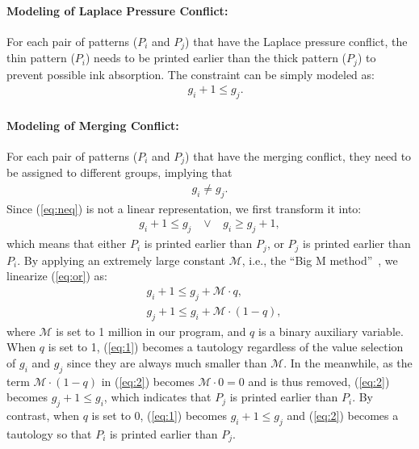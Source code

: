 \paragraph{Modeling of Laplace Pressure Conflict: }

For each pair of patterns ($P_i$ and $P_j$) that have the Laplace pressure conflict,
the thin pattern ($P_i$) needs to be printed earlier than the thick pattern ($P_j$) to prevent possible ink absorption.
The constraint can be simply modeled as:
\begin{align}
\quad g_i + 1 \leq g_j. \label{eq:merge}
\end{align}

\paragraph{Modeling of Merging Conflict: }

For each pair of patterns ($P_i$ and $P_j$) that have the merging conflict,
they need to be assigned to different groups,
implying that
\begin{align}
g_i \neq g_j. \label{eq:neq}
\end{align}
Since (\ref{eq:neq}) is not a linear representation,
we first transform it into:
\begin{align}
g_i + 1 \leq g_j \;\;\; \lor \;\;\; g_i \geq g_j + 1, \label{eq:or}
\end{align}
which means that either $P_i$ is printed earlier than $P_j$,
or $P_j$ is printed earlier than $P_i$.
By applying an extremely large constant $\mathcal{M}$,
i.e., the ``Big M method''~\cite{MITILP},
we linearize (\ref{eq:or}) as:
\begin{align}
&g_i + 1 \leq g_j + \mathcal{M} \cdot q, \label{eq:1} \\
&g_j + 1 \leq g_i + \mathcal{M} \cdot (1-q), \label{eq:2}
\end{align}
where $\mathcal{M}$ is set to 1 million in our program,
and $q$ is a binary auxiliary variable.
When $q$ is set to 1, (\ref{eq:1}) becomes a tautology regardless of the value selection of $g_i$ and $g_j$ since they are always much smaller than $\mathcal{M}$.
In the meanwhile, as the term $\mathcal{M} \cdot (1-q)$ in (\ref{eq:2}) becomes $\mathcal{M} \cdot 0=0$ and is thus removed,
(\ref{eq:2}) becomes $g_j + 1 \leq g_i$,
which indicates that $P_j$ is printed earlier than $P_i$.
By contrast, when $q$ is set to 0,
(\ref{eq:1}) becomes $g_i + 1 \leq g_j$ and (\ref{eq:2}) becomes a tautology 
so that $P_i$ is printed earlier than $P_j$.

